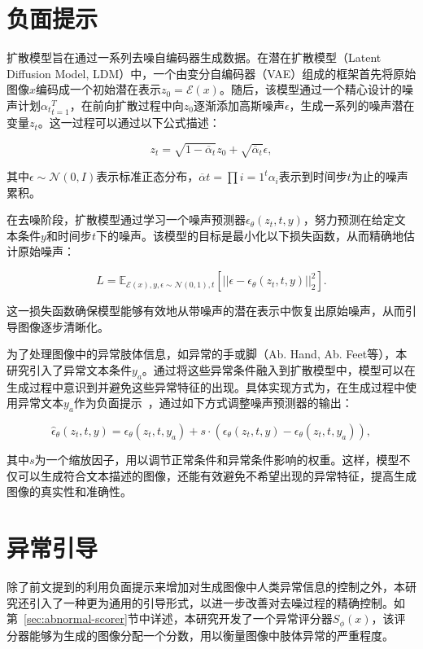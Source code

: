 \section{负面提示}

扩散模型旨在通过一系列去噪自编码器生成数据。在潜在扩散模型（Latent Diffusion Model, LDM）中，一个由变分自编码器（VAE）组成的框架首先将原始图像$x$编码成一个初始潜在表示$z_0=\mathcal{E}(x)$。随后，该模型通过一个精心设计的噪声计划${\alpha_t}_{t=1}^T$，在前向扩散过程中向$z_0$逐渐添加高斯噪声$\epsilon$，生成一系列的噪声潜在变量$z_t$。这一过程可以通过以下公式描述：

\begin{equation}
    z_t = \sqrt{1 - \overline{\alpha}_t} z_0 + \sqrt{\overline{\alpha}_t} \epsilon,
\end{equation}

其中$\epsilon \sim \mathcal{N}(0, I)$表示标准正态分布，$\overline{\alpha}t=\prod{i=1}^t \alpha_i$表示到时间步$t$为止的噪声累积。

在去噪阶段，扩散模型通过学习一个噪声预测器$\epsilon_\theta(z_t, t, y)$，努力预测在给定文本条件$y$和时间步$t$下的噪声。该模型的目标是最小化以下损失函数，从而精确地估计原始噪声：



\begin{equation}
    L = \mathbb{E}_{\mathcal{E}(x), y, \epsilon \sim \mathcal{N}(0,1),t}[ || \epsilon - \epsilon_\theta(z_t, t, y)||_2^2].
\end{equation}

这一损失函数确保模型能够有效地从带噪声的潜在表示中恢复出原始噪声，从而引导图像逐步清晰化。

为了处理图像中的异常肢体信息，如异常的手或脚（Ab. Hand, Ab. Feet等），本研究引入了异常文本条件$y_a$。通过将这些异常条件融入到扩散模型中，模型可以在生成过程中意识到并避免这些异常特征的出现。具体实现方式为，在生成过程中使用异常文本$y_a$作为负面提示~\cite{Posetrack_andriluka2018posetrack}，通过如下方式调整噪声预测器的输出：

\begin{equation}
\hat{\epsilon}_\theta(z_t, t, y) = \epsilon_\theta(z_t , t, y_a) + s \cdot (\epsilon_\theta(z_t, t, y) - \epsilon_\theta(z_t, t, y_a)),
\end{equation}

其中$s$为一个缩放因子，用以调节正常条件和异常条件影响的权重。这样，模型不仅可以生成符合文本描述的图像，还能有效避免不希望出现的异常特征，提高生成图像的真实性和准确性。

\section{异常引导}
除了前文提到的利用负面提示来增加对生成图像中人类异常信息的控制之外，本研究还引入了一种更为通用的引导形式，以进一步改善对去噪过程的精确控制。如第~\ref{sec:abnormal-scorer}节中详述，本研究开发了一个异常评分器$S_\phi(x)$，该评分器能够为生成的图像分配一个分数，用以衡量图像中肢体异常的严重程度。

